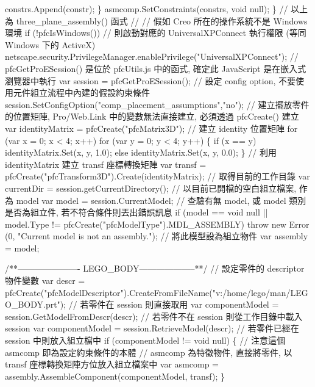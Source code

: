 \documentclass[]{article}
\newenvironment{Shaded}{}{}
\newcommand{\StringTok}[1]{\textcolor[rgb]{0.25,0.44,0.63}{{#1}}}
\begin{document}
\begin{Shaded}
\begin{Highlighting}[]
\StringTok{    constrs.Append(constr);}
\StringTok{\}}
\StringTok{asmcomp.SetConstraints(constrs, void null);}
\StringTok{\}}
\StringTok{// 以上為 three_plane_assembly() 函式}
\StringTok{//}
\StringTok{// 假如 Creo 所在的操作系統不是 Windows 環境}
\StringTok{if (!pfcIsWindows())}
\StringTok{// 則啟動對應的 UniversalXPConnect 執行權限 (等同 Windows 下的 ActiveX)}
\StringTok{netscape.security.PrivilegeManager.enablePrivilege("UniversalXPConnect");}
\StringTok{// pfcGetProESession() 是位於 pfcUtils.js 中的函式, 確定此 JavaScript 是在嵌入式瀏覽器中執行}
\StringTok{var session = pfcGetProESession();}
\StringTok{// 設定 config option, 不要使用元件組立流程中內建的假設約束條件}
\StringTok{session.SetConfigOption("comp_placement_assumptions","no");}
\StringTok{// 建立擺放零件的位置矩陣, Pro/Web.Link 中的變數無法直接建立, 必須透過 pfcCreate() 建立}
\StringTok{var identityMatrix = pfcCreate("pfcMatrix3D");}
\StringTok{// 建立 identity 位置矩陣}
\StringTok{for (var x = 0; x < 4; x++)}
\StringTok{for (var y = 0; y < 4; y++)}
\StringTok{\{}
\StringTok{    if (x == y)}
\StringTok{        identityMatrix.Set(x, y, 1.0);}
\StringTok{    else}
\StringTok{        identityMatrix.Set(x, y, 0.0);}
\StringTok{\}}
\StringTok{// 利用 identityMatrix 建立 transf 座標轉換矩陣}
\StringTok{var transf = pfcCreate("pfcTransform3D").Create(identityMatrix);}
\StringTok{// 取得目前的工作目錄}
\StringTok{var currentDir = session.getCurrentDirectory();}
\StringTok{// 以目前已開檔的空白組立檔案, 作為 model}
\StringTok{var model = session.CurrentModel;}
\StringTok{// 查驗有無 model, 或 model 類別是否為組立件, 若不符合條件則丟出錯誤訊息}
\StringTok{if (model == void null || model.Type != pfcCreate("pfcModelType").MDL_ASSEMBLY)}
\StringTok{throw new Error (0, "Current model is not an assembly.");}
\StringTok{// 將此模型設為組立物件}
\StringTok{var assembly = model;}

\StringTok{/**---------------------- LEGO_BODY--------------------**/}
\StringTok{// 設定零件的 descriptor 物件變數}
\StringTok{var descr = pfcCreate("pfcModelDescriptor").CreateFromFileName("v:/home/lego/man/LEGO_BODY.prt");}
\StringTok{// 若零件在 session 則直接取用}
\StringTok{var componentModel = session.GetModelFromDescr(descr);}
\StringTok{// 若零件不在 session 則從工作目錄中載入 session}
\StringTok{var componentModel = session.RetrieveModel(descr);}
\StringTok{// 若零件已經在 session 中則放入組立檔中}
\StringTok{if (componentModel != void null)}
\StringTok{\{}
\StringTok{    // 注意這個 asmcomp 即為設定約束條件的本體}
\StringTok{    // asmcomp 為特徵物件, 直接將零件, 以 transf 座標轉換矩陣方位放入組立檔案中}
\StringTok{    var asmcomp = assembly.AssembleComponent(componentModel, transf);}
\StringTok{\}}


\end{Highlighting}
\end{Shaded}
\end{document}
